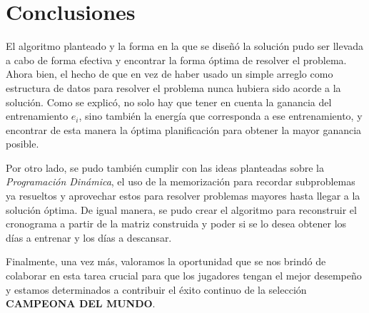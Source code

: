 \section{Conclusiones}

El algoritmo planteado y la forma en la que se diseñó la solución pudo ser llevada a cabo de forma efectiva y encontrar la forma óptima de resolver el problema. Ahora bien, el hecho de que en vez de haber usado un simple arreglo como estructura de datos para resolver el problema nunca hubiera sido acorde a la solución. Como se explicó, no solo hay que tener en cuenta la ganancia del entrenamiento $e_i$, sino también la energía que corresponda a ese entrenamiento, y encontrar de esta manera la óptima planificación para obtener la mayor ganancia posible.

Por otro lado, se pudo también cumplir con las ideas planteadas sobre la \textit{Programación Dinámica}, el uso de la memorización para recordar subproblemas ya resueltos y aprovechar estos para resolver problemas mayores hasta llegar a la solución óptima. De igual manera, se pudo crear el algoritmo para reconstruir el cronograma a partir de la matriz construida y poder si se lo desea obtener los días a entrenar y los días a descansar.


Finalmente, una vez más, valoramos la oportunidad que se nos brindó de colaborar en esta tarea crucial para que los jugadores tengan el mejor desempeño y estamos determinados a contribuir el éxito continuo de la selección \textbf{CAMPEONA DEL MUNDO}.

